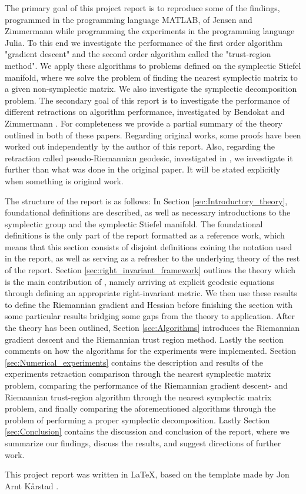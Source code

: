 The primary goal of this project report is to reproduce some of the findings, programmed in the programming language MATLAB, of Jensen and Zimmermann \cite{JensenZimmermann2024} while programming the experiments in the programming language Julia. To this end we investigate the performance of the first order algorithm "gradient descent" and the second order algorithm called the "trust-region method". We apply these algorithms to problems defined on the symplectic Stiefel manifold, where we solve the problem of finding the nearest symplectic matrix to a given non-symplectic matrix. We also investigate the symplectic decomposition problem. The secondary goal of this report is to investigate the performance of different retractions on algorithm performance, investigated by Bendokat and Zimmermann \cite{BendokatZimmermann2021}. For completeness we provide a partial summary of the theory outlined in both of these papers. Regarding original works, some proofs have been worked out independently by the author of this report. Also, regarding the retraction called pseudo-Riemannian geodesic, investigated in \cite{BendokatZimmermann2021}, we investigate it further than what was done in the original paper. It will be stated explicitly when something is original work. 

The structure of the report is as follows: In Section \ref{sec:Introductory_theory}, foundational definitions are described, as well as necessary introductions to the symplectic group and the symplectic Stiefel manifold. The foundational definitions is the only part of the report formatted as a reference work, which means that this section consists of disjoint definitions coining the notation used in the report, as well as serving as a refresher to the underlying theory of the rest of the report. Section \ref{sec:right_invariant_framework} outlines the theory which is the main contribution of \cite{BendokatZimmermann2021}, namely arriving at explicit geodesic equations through defining an appropriate right-invariant metric. We then use these results to define the Riemannian gradient and Hessian before finishing the section with some particular results bridging some gaps from the theory to application. After the theory has been outlined, Section \ref{sec:Algorithms} introduces the Riemannian gradient descent and the Riemannian trust region method. Lastly the section comments on how the algorithms for the experiments were implemented. Section \ref{sec:Numerical_experiments} contains the description and results of the experiments retraction comparison through the nearest symplectic matrix problem, comparing the performance of the Riemannian gradient descent- and Riemannian trust-region algorithm through the nearest symplectic matrix problem, and finally comparing the aforementioned algorithms through the problem of performing a proper symplectic decomposition. Lastly Section \ref{sec:Conclusion} contains the discussion and conclusion of the report, where we summarize our findings, discuss the results, and suggest directions of further work.  

This project report was written in \LaTeX, based on the template made by Jon Arnt Kårstad \cite{Kårstad2024}.